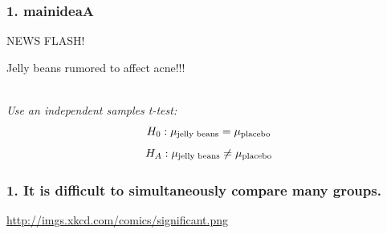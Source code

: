 \documentclass[slidestop,compress,mathserif,12pt,t,professionalfonts,xcolor=table]{beamer}
\newcommand{\soln}[1]{\textit{#1}}
\newcommand{\mainideaA}{It is difficult to simultaneously compare many groups.}
\begin{document}
\begin{frame}
  \frametitle{1. mainideaA}

  \begin{center}
  {\Large NEWS FLASH!}

  \hspace{12pt}

  Jelly beans rumored to affect acne!!!
  \end{center}

  \pause


    \hfill \\

    \pause
   \soln{
     Use an independent samples t-test:
     \[
     H_0: \mu_{\textmd{jelly beans}} = \mu_{\textmd{placebo}}
     \]
     \[
     H_A: \mu_{\textmd{jelly beans}} \neq \mu_{\textmd{placebo}}
     \]
   }

\end{frame}


\begin{frame}
  \frametitle{1. \mainideaA}

  \vfill
  
  \begin{center}
  \url{http://imgs.xkcd.com/comics/significant.png}
  \end{center}

\end{frame}

\end{document}
